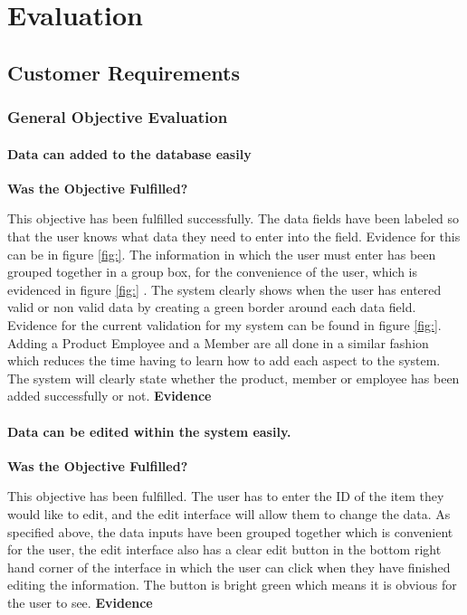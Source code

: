 \chapter{Evaluation}

\section{Customer Requirements}

\subsection{General Objective Evaluation}

\subsubsection{Data can added to the database easily}
\textbf{Was the Objective Fulfilled?} \newline

This objective has been fulfilled successfully. The data fields have been labeled so that the user knows what data they need to enter into the field. Evidence for this can be in figure \ref{fig:}. The information in which the user must enter has been grouped together in a group box, for the convenience of the user, which is evidenced in figure \ref{fig:} . The system clearly shows when the user has entered valid or non valid data by creating a green border around each data field. Evidence for the current validation for my system can be found in figure \ref{fig:}. Adding a Product Employee and a Member are all done in a similar fashion which reduces the time having to learn how to add each aspect to the system. The system will clearly state whether the product, member or employee has been added successfully or not.
\textbf{Evidence} \newline

\subsubsection{Data can be edited within the system easily.}
\textbf{Was the Objective Fulfilled?} \newline

This objective has been fulfilled. The user has to enter the ID of the item they would like to edit, and the edit interface will allow them to change the data. As specified above, the data inputs have been grouped together which is convenient for the user, the edit interface also has a clear edit button in the bottom right hand corner of the interface in which the user can click when they have finished editing the information. The button is bright green which means it is obvious for the user to see.
\textbf{Evidence} \newline

